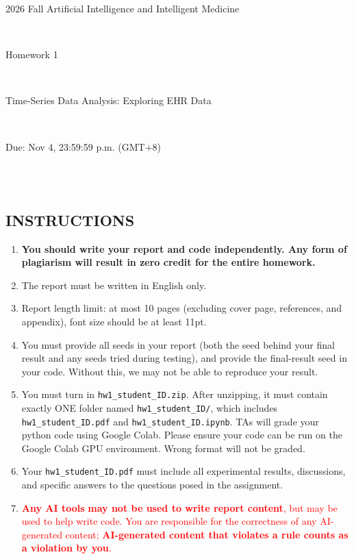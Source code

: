 \documentclass{article}
\begin{document}
{\centerline{\LARGE 2026 Fall Artificial Intelligence and Intelligent Medicine}}
\ \\
{\centerline{\Large Homework 1}}
\ \\
{\centerline{\Large Time-Series Data Analysis: Exploring EHR Data}}
\ \\
{\centerline{\Large Due: Nov 4, 23:59:59 p.m. (GMT+8)}}
\ \\\\


\subsection*{INSTRUCTIONS}
\begin{enumerate}
    \item \textbf{You should write your report and code independently. Any form of plagiarism will result in zero credit for the entire homework.}
    \item The report must be written in English only.
    \item Report length limit: at most 10 pages (excluding cover page, references, and appendix), font size should be at least 11pt.
    \item You must provide all seeds in your report (both the seed behind your final result and any seeds tried during testing), and provide the final-result seed in your code. Without this, we may not be able to reproduce your result.
    \item You must turn in \texttt{hw1\_student\_ID.zip}. After unzipping, it must contain exactly ONE folder named \texttt{hw1\_student\_ID/}, which includes \texttt{hw1\_student\_ID.pdf} and \texttt{hw1\_student\_ID.ipynb}. TAs will grade your python code using Google Colab. Please ensure your code can be run on the Google Colab GPU environment. Wrong format will not be graded.
    \item Your \texttt{hw1\_student\_ID.pdf} must include all experimental results, discussions, and specific answers to the questions posed in the assignment.
    \item \textcolor{red}{\textbf{Any AI tools} \textbf{may not be used to write report content}, but may be used to help write code. You are responsible for the correctness of any AI-generated content; \textbf{AI-generated content that violates a rule counts as a violation by you}.}
\end{enumerate}
\end{document}
